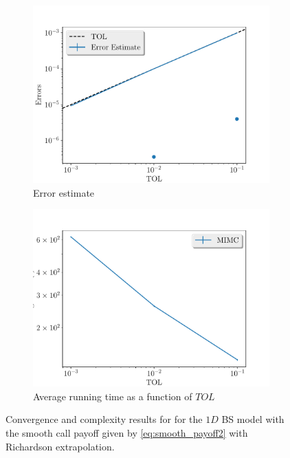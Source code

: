 \documentclass[11pt]{article}
\begin{document}
\begin{figure}[!h]
	\centering
	\begin{subfigure}{.5\textwidth}
		\centering
		\includegraphics[width=1\linewidth]{./figures/1D_BS_8_16_steps_smooth_second_payoff_eps_10_5_richardson/error_estimate.pdf}
		\caption{Error estimate}
		\label{fig:misc_1D_BS_8_16_steps_smooth_second_payoff_eps_10_5_sub1}
	\end{subfigure}%
	\begin{subfigure}{.5\textwidth}
		\centering
		\includegraphics[width=1\linewidth]{./figures/1D_BS_8_16_steps_smooth_second_payoff_eps_10_5_richardson/average_running_time.pdf}
		\caption{Average running time as a function of $TOL$}
		\label{fig:misc_1D_BS_8_16_steps_smooth_second_payoff_eps_10_5_sub2}
	\end{subfigure}%
	\caption{Convergence and complexity results for for the $1D$ BS model with the smooth call payoff given by \eqref{eq:smooth_payoff2} with Richardson extrapolation.}
	\label{fig:misc_1D_BS_8_16_steps_smooth_second_payoff_eps_10_5_1}
\end{figure}
\end{document}
